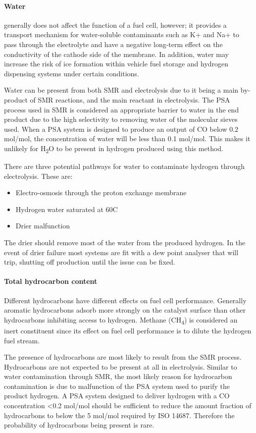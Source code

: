 \paragraph{Water}
generally does not affect the function of a fuel cell, however; it provides a transport mechanism for 
water-soluble contaminants such as K+ and Na+ to pass through the electrolyte and have a negative long-term 
effect on the conductivity of the cathode side of the membrane. In addition, water may increase the risk of 
ice formation within vehicle fuel storage and hydrogen dispensing systems under certain conditions. 

Water can be present from both SMR and electrolysis due to it being a main by-product of SMR reactions, 
and the main reactant in electrolysis. The PSA process used in SMR is considered an appropriate barrier to 
water in the end product due to the high selectivity to removing water of the molecular sieves used. 
When a PSA system is designed to produce an output of CO below 0.2 \textmu mol/mol, the concentration 
of water will be less than 0.1 \textmu mol/mol. This makes it unlikely for H\textsubscript{2}O to be 
present in hydrogen produced using this method.


There are three potential pathways for water to contaminate hydrogen through electrolysis. These are:
\begin{itemize}
    \item Electro-osmosis through the proton exchange membrane
    \item Hydrogen water saturated at 60\textdegree C
    \item Drier malfunction
\end{itemize}
The drier should remove most of the water from the produced hydrogen. In the event of drier failure most 
systems are fit with a dew point analyser that will trip, shutting off production until the issue can be fixed. 

\paragraph{Total hydrocarbon content}
Different hydrocarbons have different effects on fuel cell performance. Generally aromatic hydrocarbons 
adsorb more strongly on the catalyst surface than other hydrocarbons inhibiting access to hydrogen. 
Methane (CH\textsubscript{4}) is considered an inert constituent since its effect on fuel cell performance 
is to dilute the hydrogen fuel stream.

The presence of hydrocarbons are most likely to result from the SMR process. Hydrocarbons are not expected 
to be present at all in electrolysis. Similar to water contamination through SMR, the most likely reason 
for hydrocarbon contamination is due to malfunction of the PSA system used to purify the product hydrogen. 
A PSA system designed to deliver hydrogen with a CO concentration <0.2 \textmu mol/mol should be sufficient 
to reduce the amount fraction of hydrocarbons to below the 5 \textmu mol/mol required by ISO 14687. 
Therefore the probability of hydrocarbons being present is rare. 

